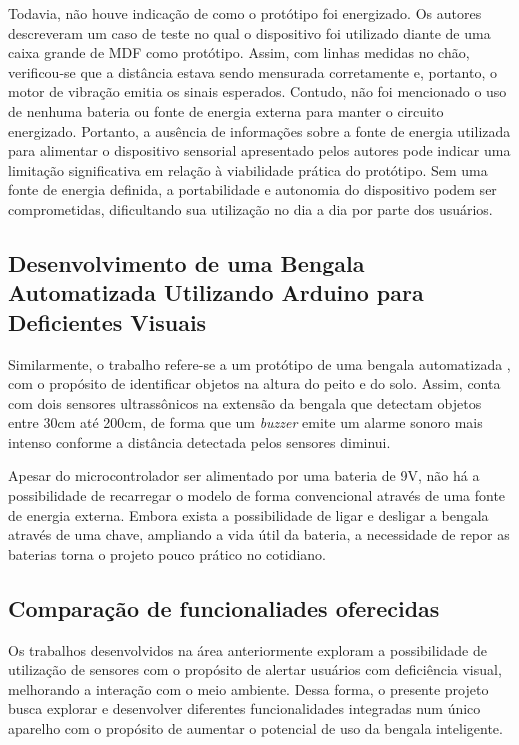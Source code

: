         Todavia, não houve indicação de como o protótipo foi energizado. Os autores descreveram um caso de teste no qual o dispositivo foi utilizado diante de uma caixa grande de MDF como protótipo. Assim, com linhas medidas no chão, verificou-se que a distância estava sendo mensurada corretamente e, portanto, o motor de vibração emitia os sinais esperados. Contudo, não foi mencionado o uso de nenhuma bateria ou fonte de energia externa para manter o circuito energizado. Portanto, a ausência de informações sobre a fonte de energia utilizada para alimentar o dispositivo sensorial apresentado pelos autores pode indicar uma limitação significativa em relação à viabilidade prática do protótipo. Sem uma fonte de energia definida, a portabilidade e autonomia do dispositivo podem ser comprometidas, dificultando sua utilização no dia a dia por parte dos usuários.
    
    \subsection{Desenvolvimento de uma Bengala Automatizada Utilizando Arduino para Deficientes Visuais}

        Similarmente, o trabalho refere-se a um protótipo de uma bengala automatizada \cite{BengalaAutomatizadaArduino}, com o propósito de identificar objetos na altura do peito e do solo. Assim, conta com dois sensores ultrassônicos na extensão da bengala que detectam objetos entre 30cm até 200cm, de forma que um \textit{buzzer} emite um alarme sonoro mais intenso conforme a distância detectada pelos sensores diminui. 
    
        Apesar do microcontrolador ser alimentado por uma bateria de 9V, não há a possibilidade de recarregar o modelo de forma convencional através de uma fonte de energia externa. Embora exista a possibilidade de ligar e desligar a bengala através de uma chave, ampliando a vida útil da bateria, a necessidade de repor as baterias torna o projeto pouco prático no cotidiano.

    \subsection{Comparação de funcionaliades oferecidas}
    
    Os trabalhos desenvolvidos na área anteriormente exploram a possibilidade de utilização de sensores com o propósito de alertar usuários com deficiência visual, melhorando a interação com o meio ambiente. Dessa forma, o presente projeto busca explorar e desenvolver diferentes funcionalidades integradas num único aparelho com o propósito de aumentar o potencial de uso da bengala inteligente. 

